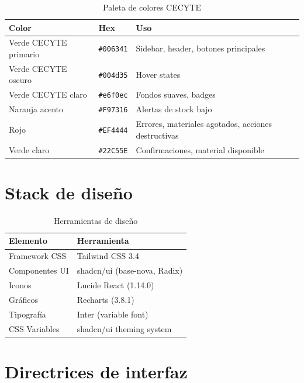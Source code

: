 \documentclass[12pt,a4paper,oneside]{report}
\newcommand{\file}[1]{\texttt{\color{cecyteDark}#1}}
\begin{document}
\begin{table}[H]
\centering
\caption{Paleta de colores CECYTE}
\begin{tabular}{@{}L{5cm}L{4cm}L{6.5cm}@{}}
\toprule
{}
\textbf{Color} & \textbf{Hex} & \textbf{Uso} \\
\midrule
Verde CECYTE primario & \file{\#006341} & Sidebar, header, botones principales \\
Verde CECYTE oscuro   & \file{\#004d35} & Hover states \\
Verde CECYTE claro    & \file{\#e6f0ec} & Fondos suaves, badges \\
Naranja acento        & \file{\#F97316} & Alertas de stock bajo \\
Rojo                  & \file{\#EF4444} & Errores, materiales agotados, acciones destructivas \\
Verde claro           & \file{\#22C55E} & Confirmaciones, material disponible \\
\bottomrule
\end{tabular}
\end{table}

\section{Stack de diseño}

\begin{table}[H]
\centering
\caption{Herramientas de diseño}
\begin{tabular}{@{}L{5cm}L{10.5cm}@{}}
\toprule
{}
\textbf{Elemento} & \textbf{Herramienta} \\
\midrule
Framework CSS      & Tailwind CSS 3.4 \\
Componentes UI     & shadcn/ui (base-nova, Radix) \\
Iconos             & Lucide React (1.14.0) \\
Gráficos           & Recharts (3.8.1) \\
Tipografía         & Inter (variable font) \\
CSS Variables      & shadcn/ui theming system \\
\bottomrule
\end{tabular}
\end{table}

\section{Directrices de interfaz}
\end{document}
